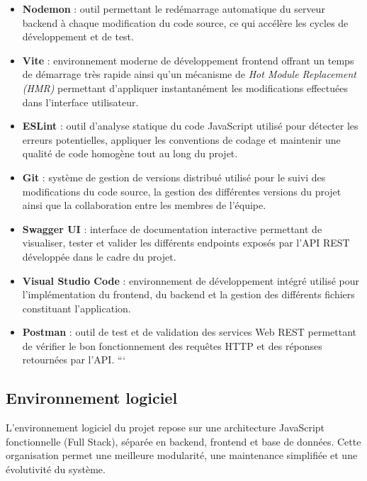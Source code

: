 \begin{itemize}
\item \textbf{Nodemon} : outil permettant le redémarrage automatique du serveur backend à chaque modification du code source, ce qui accélère les cycles de développement et de test.

\item \textbf{Vite} : environnement moderne de développement frontend offrant un temps de démarrage très rapide ainsi qu'un mécanisme de \textit{Hot Module Replacement (HMR)} permettant d'appliquer instantanément les modifications effectuées dans l'interface utilisateur.

\item \textbf{ESLint} : outil d'analyse statique du code JavaScript utilisé pour détecter les erreurs potentielles, appliquer les conventions de codage et maintenir une qualité de code homogène tout au long du projet.

\item \textbf{Git} : système de gestion de versions distribué utilisé pour le suivi des modifications du code source, la gestion des différentes versions du projet ainsi que la collaboration entre les membres de l'équipe.

\item \textbf{Swagger UI} : interface de documentation interactive permettant de visualiser, tester et valider les différents endpoints exposés par l'API REST développée dans le cadre du projet.

\item \textbf{Visual Studio Code} : environnement de développement intégré utilisé pour l'implémentation du frontend, du backend et la gestion des différents fichiers constituant l'application.

\item \textbf{Postman} : outil de test et de validation des services Web REST permettant de vérifier le bon fonctionnement des requêtes HTTP et des réponses retournées par l'API.
```

\end{itemize}


\subsection{Environnement logiciel}
\label{subsec:logiciel}

L’environnement logiciel du projet repose sur une architecture JavaScript fonctionnelle (Full Stack), séparée en backend, frontend et base de données. Cette organisation permet une meilleure modularité, une maintenance simplifiée et une évolutivité du système.


